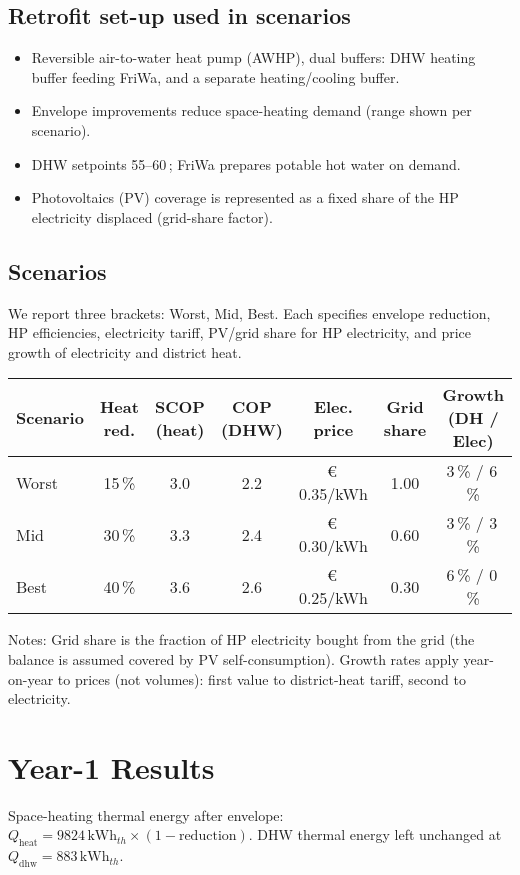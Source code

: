 \documentclass[11pt,oneside]{report}
\begin{document}
\section{Retrofit set-up used in scenarios}
\begin{itemize}
  \item Reversible air-to-water heat pump (AWHP), dual buffers: DHW heating buffer feeding FriWa, and a separate heating/cooling buffer.
  \item Envelope improvements reduce space-heating demand (range shown per scenario).
  \item DHW setpoints 55--60\,\textcelsius; FriWa prepares potable hot water on demand.
  \item Photovoltaics (PV) coverage is represented as a fixed share of the HP electricity displaced (grid-share factor).
\end{itemize}

\section{Scenarios}
We report three brackets: Worst, Mid, Best. Each specifies envelope reduction, HP efficiencies, electricity tariff, PV/grid share for HP electricity, and price growth of electricity and district heat.

\begin{longtable}{@{}lcccccc@{}}
\toprule
Scenario & Heat red. & SCOP (heat) & COP (DHW) & Elec. price & Grid share & Growth (DH / Elec) \\
\midrule
Worst & \num{15}\,\% & \num{3.0} & \num{2.2} & \euro\,\num{0.35}/kWh & \num{1.00} & \num{3}\,\% / \num{6}\,\% \\
Mid   & \num{30}\,\% & \num{3.3} & \num{2.4} & \euro\,\num{0.30}/kWh & \num{0.60} & \num{3}\,\% / \num{3}\,\% \\
Best  & \num{40}\,\% & \num{3.6} & \num{2.6} & \euro\,\num{0.25}/kWh & \num{0.30} & \num{6}\,\% / \num{0}\,\% \\
\bottomrule
\end{longtable}

Notes: Grid share is the fraction of HP electricity bought from the grid (the balance is assumed covered by PV self-consumption). Growth rates apply year-on-year to prices (not volumes): first value to district-heat tariff, second to electricity.

\chapter{Year-1 Results}
\label{ch:year1}
Space-heating thermal energy after envelope: \(Q_\mathrm{heat} = 9824\,\mathrm{kWh}_{th} \times (1-\mathrm{reduction})\). DHW thermal energy left unchanged at \(Q_\mathrm{dhw}=\num{883}\,\mathrm{kWh}_{th}\).
\end{document}
